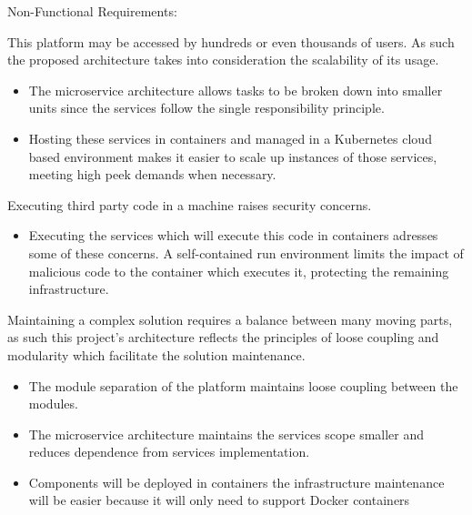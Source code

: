 \begin{flushleft}
Non-Functional Requirements:
\end{flushleft}

\begin{description}[font=$\bullet$~\normalfont\scshape\color{red!50!black}]
\item[Scalability] This platform may be accessed by hundreds or even thousands of users. As such the proposed architecture takes into consideration the scalability of its usage.
\\
	\begin{itemize}
		\item The microservice architecture allows tasks to be broken down into smaller units since the services follow the single responsibility principle.
		\item Hosting these services in containers and managed in a Kubernetes cloud based environment makes it easier to scale up instances of those services, meeting high peek demands when necessary.
	\end{itemize}
         
\item[Security] Executing third party code in a machine raises security concerns.
	\begin{itemize}
		\item Executing the services which will execute this code in containers adresses some of these concerns. A self-contained run environment limits the impact of malicious code to the container which executes it, protecting the remaining infrastructure.
	\end{itemize}	   
              
\item[Solution Maintenance]     
        Maintaining a complex solution requires a balance between many moving parts, as such this project's architecture reflects the principles of loose coupling and modularity which facilitate the solution maintenance. 
		\begin{itemize}
			\item The module separation of the platform maintains loose coupling between the modules.
			\item The microservice architecture maintains the services scope smaller and reduces dependence from services implementation.
			\item Components will be deployed in containers the infrastructure maintenance will be easier because it will only need to support Docker containers
		\end{itemize}		        


\end{description}
